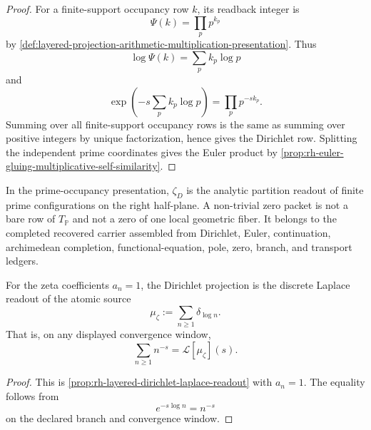 \begin{proof}
For a finite-support occupancy row $k$, its readback integer is
$$
\Psi(k)=\prod_p p^{k_p}
$$
by \autoref{def:layered-projection-arithmetic-multiplication-presentation}.
Thus
$$
\log\Psi(k)=\sum_p k_p\log p
$$
and
$$
\exp\left(-s\sum_p k_p\log p\right)
=
\prod_p p^{-sk_p}.
$$
Summing over all finite-support occupancy rows is the same as summing
over positive integers by unique factorization, hence gives the
Dirichlet row. Splitting the independent prime coordinates gives the
Euler product by \autoref{prop:rh-euler-gluing-multiplicative-self-similarity}.
\end{proof}

\begin{principle}
\label{prin:rh-zero-packets-recovered-carrier-cancellations}
In the prime-occupancy presentation, $\zeta_D$ is the analytic partition
readout of finite prime configurations on the right half-plane. A
non-trivial zero packet is not a bare row of $T_{\mathbb P}$ and not a
zero of one local geometric fiber. It belongs to the completed recovered
carrier assembled from Dirichlet, Euler, continuation, archimedean
completion, functional-equation, pole, zero, branch, and transport
ledgers.
\end{principle}

\begin{proposition}
\label{prop:rh-zeta-self-similar-laplace-readout}
For the zeta coefficients $a_n=1$, the Dirichlet projection is the
discrete Laplace readout of the atomic source
$$
\mu_{\zeta}:=\sum_{n\geq1}\delta_{\log n}.
$$
That is, on any displayed convergence window,
$$
\sum_{n\geq1}n^{-s}
=
\mathcal L[\mu_{\zeta}](s).
$$
\end{proposition}

\begin{proof}
This is \autoref{prop:rh-layered-dirichlet-laplace-readout} with
$a_n=1$. The equality follows from
$$
e^{-s\log n}=n^{-s}
$$
on the declared branch and convergence window.
\end{proof}

